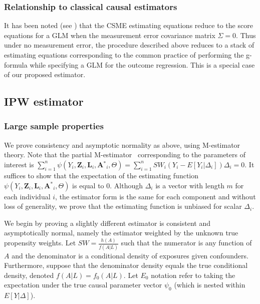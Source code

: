 \documentclass[12pt]{article}
\begin{document}
\subsubsection{Relationship to classical causal estimators}

It has been noted (see \citet{carroll2006}) that the CSME estimating equations reduce to the score equations for a GLM when the measurement error covariance matrix $\Sigma = 0$. Thus under no measurement error, the procedure described above reduces to a stack of estimating equations corresponding to the common practice of performing the g-formula while specifying a GLM for the outcome regression. This is a special case of our proposed estimator.

\subsection{IPW estimator}

\subsubsection{Large sample properties}

We prove consistency and asymptotic normality as above, using M-estimator theory. Note that the partial M-estimator~\citep{stefanski2002} corresponding to the parameters of interest is $\sum_{i=1}^{n} \psi(Y_{i}, \textbf{Z}_{i}, \textbf{L}_{i}, \textbf{A$^{*}$}_{i}, \Theta) = \sum_{i=1}^{n} SW_{i}(Y_{i} - E[Y_{i} | \Delta_{i}])\Delta_{i} = 0$. It suffices to show that the expectation of the estimating function $\psi(Y_{i}, \textbf{Z}_{i}, \textbf{L}_{i}, \textbf{A$^{*}$}_{i}, \Theta)$ is equal to 0. Although $\Delta_{i}$ is a vector with length $m$ for each individual $i$, the estimator form is the same for each component and without loss of generality, we prove that the estimating function is unbiased for scalar $\Delta_{i}$.

We begin by proving a slightly different estimator is consistent and asymptotically normal, namely the estimator weighted by the unknown true propensity weights. Let $SW = \frac{h(A)}{f(A | L)}$ such that the numerator is any function of $A$ and the denominator is a conditional density of exposures given confounders. Furthermore, suppose that the denominator density equals the true conditional density, denoted $f(A | L) = f_{0}(A | L)$. Let $E_{0}$ notation refer to taking the expectation under the true causal parameter vector $\psi_{0}$ (which is nested within $E[Y | \Delta]$).
\end{document}
